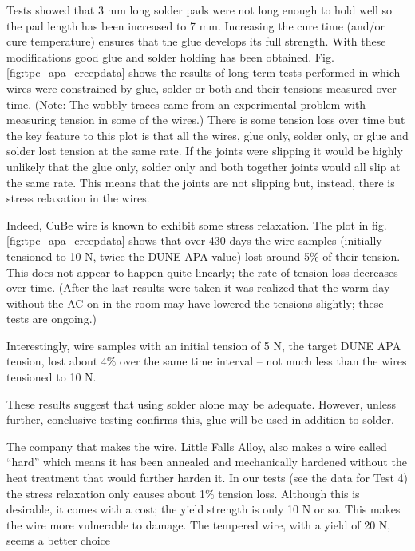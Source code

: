 Tests showed that 3 mm long solder pads were not long enough to hold well so the pad length has been increased to 7 mm.  Increasing the cure time (and/or cure temperature) ensures that the glue develops its full strength.  With these modifications good glue and solder holding has been obtained.  Fig. \ref{fig:tpc_apa_creepdata} shows the results of long term tests performed in which wires were constrained by glue, solder or both and their tensions measured over time. (Note: The wobbly traces came from an experimental problem with measuring tension in some of the wires.)  There is some tension loss over time but the key feature to this plot is that all the wires, glue only, solder only, or glue and solder lost tension at the same rate.  If the joints were slipping it would be highly unlikely that the glue only, solder only and both together joints would all slip at the same rate.  This means that the joints are not slipping but, instead, there is stress relaxation in the wires.

Indeed, CuBe wire is known to exhibit some stress relaxation.  The plot in fig. \ref{fig:tpc_apa_creepdata} shows that over 430 days the wire samples (initially tensioned to 10 N, twice the DUNE APA value) lost around 5$\%$ of their tension.  This does not appear to happen quite linearly; the rate of tension loss decreases over time.  (After the last results were taken it was realized that the warm day without the AC on in the room may have lowered the tensions slightly; these tests are ongoing.)

Interestingly, wire samples with an initial tension of 5 N, the target DUNE APA tension, lost about 4$\%$ over the same time interval -- not much less than the wires tensioned to 10 N. 

These results suggest that using solder alone may be adequate.  However, unless further, conclusive testing confirms this, glue will be used in addition to solder. 

The company that makes the wire, Little Falls Alloy, also makes a wire called ``hard'' which means it has been annealed and mechanically hardened without the heat treatment that would further harden it.  In our tests (see the data for Test 4) the stress relaxation only causes about 1$\%$ tension loss.  Although this is desirable, it comes with a cost; the yield strength is only 10 N or so.  This makes the wire more vulnerable to damage.  The tempered wire, with a yield of 20 N, seems a better choice

